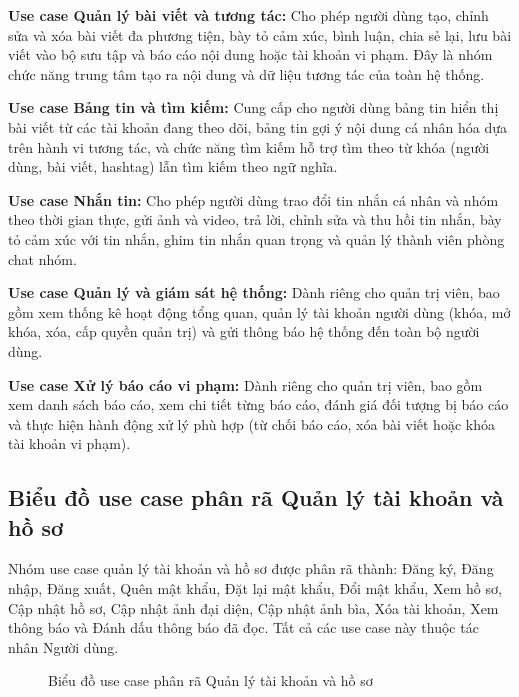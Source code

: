 \documentclass[../DoAn.tex]{subfiles}
\begin{document}
    \textbf{Use case Quản lý bài viết và tương tác:} Cho phép người dùng tạo, chỉnh sửa và xóa bài viết đa phương tiện, bày tỏ cảm xúc, bình luận, chia sẻ lại, lưu bài viết vào bộ sưu tập và báo cáo nội dung hoặc tài khoản vi phạm. Đây là nhóm chức năng trung tâm tạo ra nội dung và dữ liệu tương tác của toàn hệ thống.

    \textbf{Use case Bảng tin và tìm kiếm:} Cung cấp cho người dùng bảng tin hiển thị bài viết từ các tài khoản đang theo dõi, bảng tin gợi ý nội dung cá nhân hóa dựa trên hành vi tương tác, và chức năng tìm kiếm hỗ trợ tìm theo từ khóa (người dùng, bài viết, hashtag) lẫn tìm kiếm theo ngữ nghĩa.

    \textbf{Use case Nhắn tin:} Cho phép người dùng trao đổi tin nhắn cá nhân và nhóm theo thời gian thực, gửi ảnh và video, trả lời, chỉnh sửa và thu hồi tin nhắn, bày tỏ cảm xúc với tin nhắn, ghim tin nhắn quan trọng và quản lý thành viên phòng chat nhóm.

    \textbf{Use case Quản lý và giám sát hệ thống:} Dành riêng cho quản trị viên, bao gồm xem thống kê hoạt động tổng quan, quản lý tài khoản người dùng (khóa, mở khóa, xóa, cấp quyền quản trị) và gửi thông báo hệ thống đến toàn bộ người dùng.

    \textbf{Use case Xử lý báo cáo vi phạm:} Dành riêng cho quản trị viên, bao gồm xem danh sách báo cáo, xem chi tiết từng báo cáo, đánh giá đối tượng bị báo cáo và thực hiện hành động xử lý phù hợp (từ chối báo cáo, xóa bài viết hoặc khóa tài khoản vi phạm).

\subsection{Biểu đồ use case phân rã Quản lý tài khoản và hồ sơ}
\label{subsection:2.2.2}
Nhóm use case quản lý tài khoản và hồ sơ được phân rã thành: Đăng ký, Đăng nhập, Đăng xuất, Quên mật khẩu, Đặt lại mật khẩu, Đổi mật khẩu, Xem hồ sơ, Cập nhật hồ sơ, Cập nhật ảnh đại diện, Cập nhật ảnh bìa, Xóa tài khoản, Xem thông báo và Đánh dấu thông báo đã đọc. Tất cả các use case này thuộc tác nhân Người dùng.

\begin{figure}[H]
\centering
{}
\caption{Biểu đồ use case phân rã Quản lý tài khoản và hồ sơ}
\label{fig:use-case-account-profile}
\end{figure}
\end{document}
